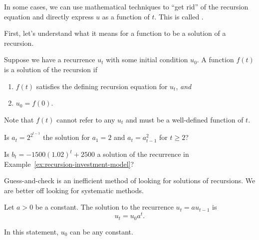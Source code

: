 \documentclass[../main.tex]{subfiles}
\begin{document}
In some cases, we can use mathematical techniques to ``get rid'' of the recursion equation and directly express  \(u\) as a function of \(t\). This is called .

First, let's understand what it means for a function to be a solution of a recursion. 

\begin{definition} \label{def:recurrence-solution}
  Suppose we have a recurrence \(u_{t}\) with some initial condition \(u_{0}\). A function \(f(t)\) is a solution of the recursion if 
  \begin{enumerate}
    \item \(f(t)\) satisfies the defining recursion equation for \(u_{t}\), \emph{and}
    \item \(u_{0} = f(0)\).
  \end{enumerate}

  Note that \(f(t)\) cannot refer to any \(u_{t}\) and must be a well-defined function of \(t\).
\end{definition}

\begin{example} \label{ex:recurrence-verify-solution}
  Is \(a_{t} = 2^{2^{t-1}}\) the solution for \(a_{1} = 2\) and \(a_{t} = a_{t-1}^{2}\) for \(t \ge 2\)?

  \blanks*
\end{example}
\clearpage

\begin{exercise} \label{ex:recurrence-verify-investment}
  Is \(b_{t} = -1500 (1.02)^{t} + 2500\) a solution  of the recurrence in Example~\ref{ex:recursion-investment-model}?

  \blanks*
\end{exercise}
\clearpage

Guess-and-check is an inefficient method of looking for solutions of recursions. We are better off looking for systematic methods.

\begin{method} \label{method:recurrence-exp}
  Let \(a > 0\) be a constant. The solution to the recurrence \(u_{t} = a u_{t-1}\) is 
  \[
    u_{t} = u_{0} a^{t}.
  \]

  In this statement, \(u_{0}\) can be any constant.
\end{method}
\end{document}
